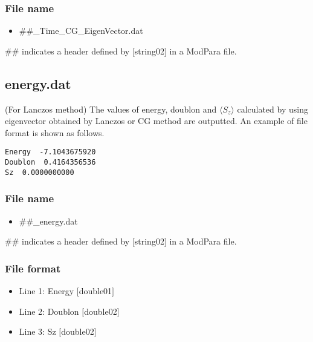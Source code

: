 \subsubsection{File name}
 \begin{itemize}
   \item  \#\#\_Time\_CG\_EigenVector.dat
 \end{itemize}
 \#\# indicates a header defined by [string02] in a ModPara file.

\newpage
\subsection{energy.dat}
\label{subsec:energy.dat}
(For Lanczos method) The values of energy, doublon and $\langle S_z \rangle$ calculated by using eigenvector obtained by Lanczos or CG method are outputted.
An example of file format is shown as follows.\\

\begin{minipage}{12.5cm}
\begin{screen}
\begin{verbatim}
Energy  -7.1043675920 
Doublon  0.4164356536 
Sz  0.0000000000 
\end{verbatim}
\end{screen}
\end{minipage}

\subsubsection{File name}
 \begin{itemize}
   \item  \#\#\_energy.dat
 \end{itemize}
 \#\# indicates a header defined by [string02] in a ModPara file.

\subsubsection{File format}
 \begin{itemize}
   \item Line 1: Energy $[$double01$]$
   \item Line 2: Doublon $[$double02$]$
   \item Line 3: Sz $[$double02$]$
  \end{itemize}
